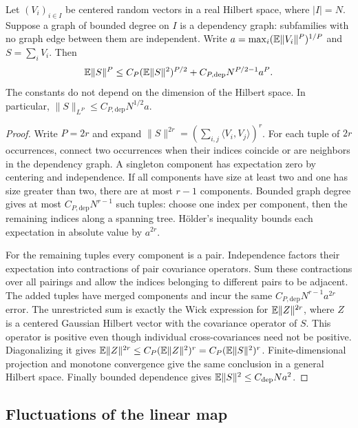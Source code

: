 \begin{lemma}
\label{mom:hilbert}
Let $(V_i)_{i\in I}$ be centered random vectors in a real Hilbert space,
where $|I|=N$.  Suppose a graph of bounded degree on $I$ is a dependency
graph: subfamilies with no graph edge between them are independent.
Write $a=\max_i(\mathbb E\|V_i\|^P)^{1/P}$ and $S=\sum_iV_i$.  Then
\begin{equation}\label{mom:hilbert-bound}
 \mathbb E\|S\|^P
 \le C_P(\mathbb E\|S\|^2)^{P/2}
       +C_{P,\mathrm{dep}}N^{P/2-1}a^P.
\end{equation}
The constants do not depend on the dimension of the Hilbert space.
In particular,
$\|S\|_{L^P}\le C_{P,\mathrm{dep}}N^{1/2}a$.
\end{lemma}

\begin{proof}
Write $P=2r$ and expand
$\|S\|^{2r}=(\sum_{i,j}\langle V_i,V_j\rangle)^r$.
For each tuple of $2r$ occurrences, connect two occurrences when their
indices coincide or are neighbors in the dependency graph.  A singleton
component has expectation zero by centering and independence.  If all
components have size at least two and one has size greater than two,
there are at most $r-1$ components.  Bounded graph degree gives at most
$C_{P,\mathrm{dep}}N^{r-1}$ such tuples: choose one index per component,
then the remaining indices along a spanning tree.  H\"older's inequality
bounds each expectation in absolute value by $a^{2r}$.

For the remaining tuples every component is a pair.  Independence
factors their expectation into contractions of pair covariance
operators.  Sum these contractions over all pairings and allow the
indices belonging to different pairs to be adjacent.  The added tuples
have merged components and incur the same
$C_{P,\mathrm{dep}}N^{r-1}a^{2r}$ error.  The unrestricted sum is exactly
the Wick expression for $\mathbb E\|Z\|^{2r}$, where $Z$ is a centered Gaussian
Hilbert vector with the covariance operator of $S$.  This operator is
positive even though individual cross-covariances need not be positive.
Diagonalizing it gives
$\mathbb E\|Z\|^{2r}\le C_P(\mathbb E\|Z\|^2)^r
=C_P(\mathbb E\|S\|^2)^r$.  Finite-dimensional projection and monotone
convergence give the same conclusion in a general Hilbert space.
Finally bounded dependence gives
$\mathbb E\|S\|^2\le C_{\mathrm{dep}}Na^2$.
\end{proof}

\subsection{Fluctuations of the linear map}

